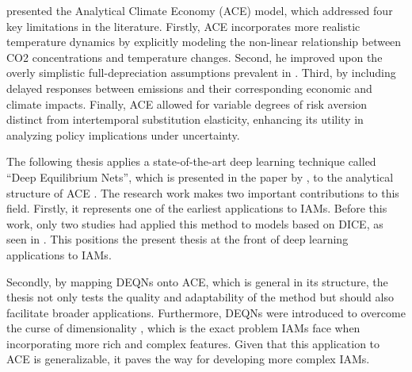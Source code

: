 \textcite{TraegerChristian2023ACE} presented the Analytical Climate Economy (ACE) model, which addressed four key limitations in the literature. Firstly, ACE incorporates more realistic temperature dynamics by explicitly modeling the non-linear relationship between CO2 concentrations and temperature changes. Second, he improved upon the overly simplistic full-depreciation assumptions prevalent in \textcite{Golosov2014etal}. Third, by including delayed responses between emissions and their corresponding economic and climate impacts. Finally, ACE allowed for variable degrees of risk aversion distinct from intertemporal substitution elasticity, enhancing its utility in analyzing policy implications under uncertainty.

The following thesis applies a state-of-the-art deep learning technique called \enquote{Deep Equilibrium Nets}, which is presented in the paper by \textcite{Azinovic2022DEQN}, to the analytical structure of ACE \parencite{TraegerChristian2023ACE}. The research work makes two important contributions to this field. Firstly, it represents one of the earliest applications to IAMs. Before this work, only two studies had applied this method to models based on DICE, as seen in \textcite{Folini2024ClimateInCE, friedl2023_deepUQ}. This positions the present thesis at the front of deep learning applications to IAMs.

Secondly, by mapping DEQNs onto ACE, which is general in its structure, the thesis not only tests the quality and adaptability of the method but should also facilitate broader applications. Furthermore, DEQNs were introduced to overcome the curse of dimensionality \parencite{Bellman1961}, which is the exact problem IAMs face when incorporating more rich and complex features. Given that this application to ACE is generalizable, it paves the way for developing more complex IAMs.